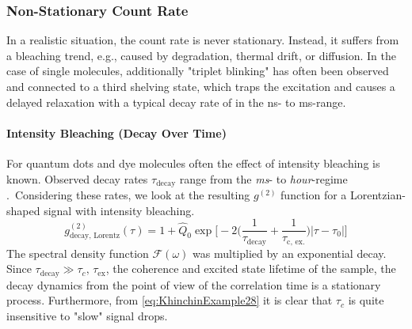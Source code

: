 \subsubsection{Non-Stationary Count Rate}\label{sec:Nonstationary}
In a realistic situation, the count rate is never stationary. Instead, it suffers from a bleaching trend, e.g., caused by degradation, thermal drift, or diffusion. In the case of single molecules, additionally "triplet blinking" has often been observed and connected to a third shelving state, which traps the excitation and causes a delayed relaxation with a typical decay rate of in the \si{ns}- to \si{ms}-range.

\paragraph{Intensity Bleaching (Decay Over Time)}
For quantum dots and dye molecules often the effect of intensity bleaching is known. Observed decay rates $\tau_\mathrm{decay}$ range from the \textit{ms}- to \textit{hour}-regime \cite{komatsuzaki_compact_2015}.~Considering these rates, we look at the resulting $g^{(2)}$ function for a Lorentzian-shaped signal with intensity bleaching.
\begin{equation}\label{eq:KhinchinExample28}
	g^{(2)}_\mathrm{decay,\, Lorentz}(\tau) = 1 + \hat{Q}_0\exp\Big[-2\Big(\dfrac{1}{\tau_\mathrm{decay}}+\dfrac{1}{\tau_\mathrm{c,\, ex.}}\Big)|\tau-\tau_0|\Big]
\end{equation}
The spectral density function $\mathcal{F}(\omega)$ was multiplied by an exponential decay. Since $\tau_\mathrm{decay}\gg\tau_c,\,\tau_\mathrm{ex}$, the coherence and excited state lifetime of the sample, the decay dynamics from the point of view of the correlation time is a stationary process. Furthermore, from \cref{eq:KhinchinExample28} it is clear that $\tau_c$ is quite insensitive to "slow" signal drops. 

